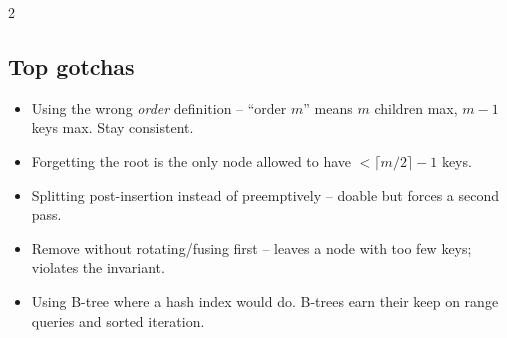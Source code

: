 \documentclass[10pt]{article}
\begin{document}
\begin{multicols}{2}
\subsection*{Top gotchas}
\begin{itemize}
    \item Using the wrong \emph{order} definition -- ``order $m$''
    means $m$ children max, $m-1$ keys max. Stay consistent.
    \item Forgetting the root is the only node allowed to have
    $< \lceil m/2 \rceil - 1$ keys.
    \item Splitting post-insertion instead of preemptively -- doable
    but forces a second pass.
    \item Remove without rotating/fusing first -- leaves a node with
    too few keys; violates the invariant.
    \item Using B-tree where a hash index would do. B-trees earn
    their keep on range queries and sorted iteration.
\end{itemize}

\end{multicols}
\end{document}
